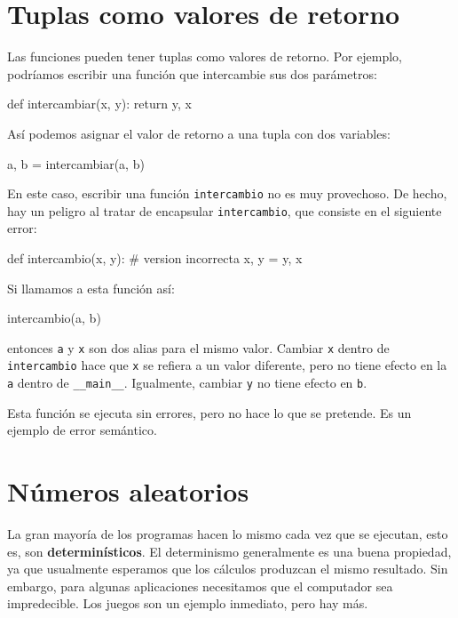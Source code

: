 \section{Tuplas como valores de retorno}

  

Las funciones pueden tener tuplas como valores de retorno. Por ejemplo,
podríamos escribir una función que intercambie sus dos parámetros:
\begin{pythoncode}
def intercambiar(x, y):
  return y, x
\end{pythoncode}

Así podemos asignar el valor de retorno a una tupla con dos variables:
\begin{pythoncode}
a, b = intercambiar(a, b)
\end{pythoncode}

En este caso, escribir una función \texttt{intercambio} no es muy
provechoso. De hecho, hay un peligro al tratar de encapsular \texttt{intercambio},
que consiste en el siguiente error:
\begin{pythoncode}
def intercambio(x, y):      # version incorrecta
  x, y = y, x
\end{pythoncode}

Si llamamos a esta función así:
\begin{pythoncode}
intercambio(a, b)
\end{pythoncode}

entonces \texttt{a} y \texttt{x} son dos alias para el mismo valor.
Cambiar \texttt{x} dentro de \texttt{intercambio} hace que \texttt{x}
se refiera a un valor diferente, pero no tiene efecto en la \texttt{a}
dentro de \texttt{\_\_main\_\_}. Igualmente, cambiar \texttt{y} no
tiene efecto en \texttt{b}.

Esta función se ejecuta sin errores, pero no hace lo que se pretende.
Es un ejemplo de error semántico.


\section{Números aleatorios}

 

La gran mayoría de los programas hacen lo mismo cada vez que se ejecutan,
esto es, son \textbf{determinísticos}. El determinismo generalmente
es una buena propiedad, ya que usualmente esperamos que los cálculos
produzcan el mismo resultado. Sin embargo, para algunas aplicaciones
necesitamos que el computador sea impredecible. Los juegos son un
ejemplo inmediato, pero hay más.

